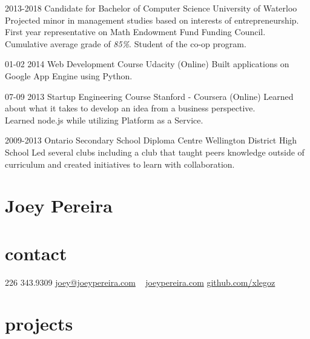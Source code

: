 \documentclass[]{friggeri-cv}
\newcommand{\imp}[1] {{\em #1}}
\begin{document}
\begin{entrylist}
  \entry
    {2013-2018}
    {Candidate for Bachelor of Computer Science}
    {University of Waterloo}
	{Projected minor in management studies based on interests of entrepreneurship. \\
	First year representative on Math Endowment Fund Funding Council. \\
	Cumulative average grade of \imp{85\%}. Student of the co-op program.
	\\ %
 }
 
 \entry
  	{01-02 2014}
  	{Web Development Course}
  	{Udacity (Online)}
  	{Built applications on Google App Engine using Python. }
	
  \entry
  	{07-09 2013}
  	{Startup Engineering Course}
  	{Stanford - Coursera (Online)}
  	{Learned about what it takes to develop an idea from a business perspective. \\
  	Learned node.js while utilizing Platform as a Service.}
  	
  \entry
  	{2009-2013}
  	{Ontario Secondary School Diploma}
  	{Centre Wellington District High School}
    {Led several clubs including a club that taught peers knowledge outside of curriculum and created initiatives to learn with collaboration.}
\end{entrylist}

\newpage 

\begin{asidetwo}  	
	\section{Joey Pereira}
	\section{contact}
    226 343.9309
    \href{mailto:joey@joeypereira.com}{joey@joeypereira.com}
    ~
    \href{http://joeypereira.com}{joeypereira.com}
    \href{http://www.github.com/xlegoz}{github.com/xlegoz}
\end{asidetwo}


\section{projects}
\end{document}
